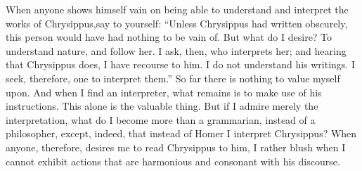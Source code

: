 When anyone  shows himself vain on  being able to understand  and interpret the
works  of Chrysippus,\footnotemark  say  to yourself:  ``Unless Chrysippus  had
written obscurely, this person  would have had nothing to be  vain of. But what
do I desire? To understand nature, and  follow her. I ask, then, who interprets
her;  and hearing  that Chrysippus  does,  I have  recourse  to him.  I do  not
understand his  writings. I seek,  therefore, one  to interpret them.''  So far
there is  nothing to value  myself upon. And when  I find an  interpreter, what
remains is to make  use of his instructions. This alone  is the valuable thing.
But  if I  admire merely  the  interpretation, what  do  I become  more than  a
grammarian, instead of  a philosopher, except, indeed, that instead  of Homer I
interpret Chrysippus? When anyone, therefore,  desires me to read Chrysippus to
him,  I rather  blush when  I cannot  exhibit actions  that are  harmonious and
consonant with his discourse. 
